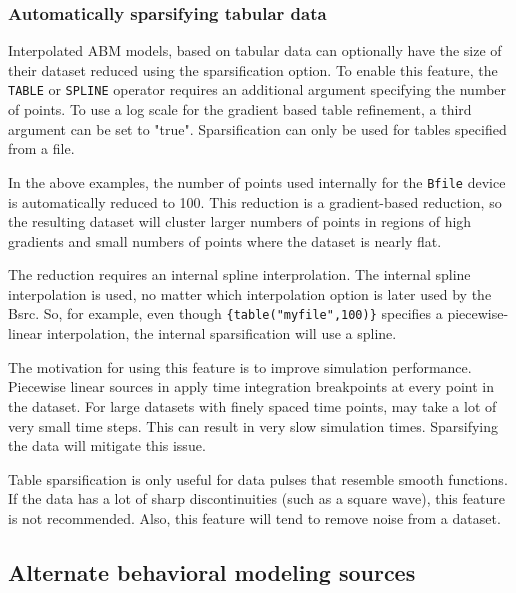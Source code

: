 \subsubsection{Automatically sparsifying tabular data}

Interpolated ABM models, based on tabular data can optionally have the size of their 
dataset reduced using the sparsification option.  To enable this feature, the \texttt{TABLE} 
or \texttt{SPLINE} operator requires an additional argument specifying the number of points.  
To use a log scale for the gradient based table refinement, a third argument can be set to "true".
Sparsification can only be used for tables specified from a file.


In the above examples, the number of points used internally for the 
\texttt{Bfile} device is automatically reduced to 100.  This 
reduction is a gradient-based reduction, 
so the resulting dataset will cluster larger numbers of points in regions of 
high gradients and small numbers of points where the dataset is nearly flat.

The reduction requires an internal spline interprolation.  The internal spline 
interpolation is used, no matter which interpolation option is later used by 
the Bsrc.  So, for example, even though \texttt{\{table("myfile",100)\}} 
specifies a piecewise-linear interpolation, the internal sparsification will 
use a spline.

The motivation for using this feature is to improve simulation performance.  
Piecewise linear sources in \Xyce{} apply time integration breakpoints at every point in the dataset.
For large datasets with finely spaced time points, \Xyce{} may take a lot of very small time steps.
This can result in very slow simulation times.  Sparsifying the data will mitigate this issue.

Table sparsification is only useful for data pulses that resemble smooth functions.   
If the data has a lot of sharp discontinuities (such as a square wave), 
this feature is not recommended. Also, this feature will tend to remove noise 
from a dataset.

\subsection{Alternate behavioral modeling sources}

